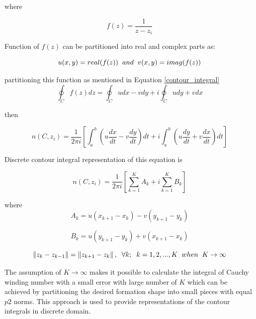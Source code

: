 where 

\begin{equation}
f(z) = \frac{1}{z-z_i}
\end{equation}
		
Function of $f(z)$ can be partitioned into real and complex parts as:

\begin{equation}
u(x,y) = real(f(z))  \hspace{0.2cm} and \hspace{0.2cm} v(x,y) = imag(f(z))
\end{equation}
		
partitioning this function as mentioned in Equation \ref{contour_integral}
\begin{equation}
\oint_C f(z)dz  = \oint_C u dx - v dy + i \oint_C u dy + v dx 
\end{equation}

then

\begin{equation}
n(C,z_i)  = \frac{1}{2\pi i} \left[\int_{a}^{b} \left(u\frac{dx}{dt} - v\frac{dy}{dt}\right)dt + i\int_{a}^{b}\left(u\frac{dy}{dt} + v\frac{dx}{dt}\right)dt\right]
\end{equation}
		
Discrete contour integral representation of this equation is
		
\begin{equation}
n(C,z_i)  = \frac{1}{2\pi i} {\left[\sum_{k=1}^{K} {A_k} + i\sum_{k=1}^{K} {B_k}\right]}
\end{equation}

where
\begin{equation}
A_k = u(x_{k+1} - x_k ) - v(y_{k+1} -y_k )
\end{equation}

\begin{equation}
B_k = u(y_{k+1} - y_k ) + v(x_{k+1} - x_k)
\end{equation}


\begin{equation}
\left\lVert z_k - z_{k-1}\right\rVert = \left\lVert z_{k+1} - z_k\right\rVert, \hspace{0.2cm}  \forall k ;  \hspace{0.2cm} k=1,2,...,K \hspace{0.2cm} when  \hspace{0.2cm} K \to\infty
\end{equation}

The assumption of $K \to\infty$ makes it possible to calculate the integral of Cauchy winding number with a small error with large number of $K$ which can be achieved by partitioning the desired formation shape  into small pieces with equal $p2$ norms. This approach is used to provide representations of the contour integrals in discrete domain. 

